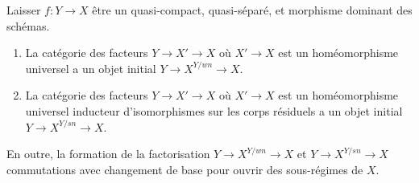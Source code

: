 \begin{lemma}

\label{lemma-relative-seminormalization}

Laisser $f : Y \to X$ être un quasi-compact, quasi-séparé, et morphisme dominant des schémas.

\begin{enumerate}

\item La catégorie des facteurs $Y \to X' \to X$ où $X' \to X$
est un homéomorphisme universel a un objet initial $Y \to X^{Y/wn} \to X$.
\item La catégorie des facteurs $Y \to X' \to X$ où $X' \to X$
est un homéomorphisme universel inducteur d'isomorphismes sur les corps résiduels a un objet initial $Y \to X^{Y/sn} \to X$.

\end{enumerate}

En outre, la formation de la factorisation $Y \to X^{Y/wn} \to X$ et
$Y \to X^{Y/sn} \to X$ commutations avec changement de base pour ouvrir des sous-régimes de $X$.

\end{lemma}

